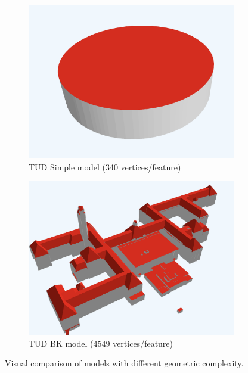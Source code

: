 \begin{figure}[htbp]
  \centering
  \begin{subfigure}{0.48\textwidth}
    \centering
    \includegraphics[width=\textwidth]{figs/result_analysis/tud_simple.png}
    \caption{TUD Simple model (340 vertices/feature)}
    \label{fig:tud_simple}
  \end{subfigure}
  \hfill
  \begin{subfigure}{0.48\textwidth}
    \centering
    \includegraphics[width=\textwidth]{figs/result_analysis/tud_bk.png}
    \caption{TUD BK model (4549 vertices/feature)}
    \label{fig:tud_bk}
  \end{subfigure}
  \caption{Visual comparison of models with different geometric complexity.}
  \label{fig:geometry_comparison}
\end{figure}

